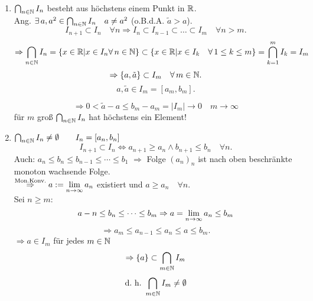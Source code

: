 \documentclass[../ana1.tex]{subfiles}
\begin{document}
\begin{bew}\leavevmode
	\begin{enumerate}
		\item \( \bigcap_{n\in\mathbb{N}} I_n \) besteht aus höchstens einem Punkt in \(\mathbb{R} \).\\
		Ang. \( \exists a, a^2 \in \bigcap_{n\in\N} I_n \quad a\neq a^2 \) (o.B.d.A. \(\tilde{a}>a\)).\\
		\[I_{n+1} \subset I_n \quad\forall n \Rightarrow I_n \subset I_{n-1} \subset \ldots\subset I_m \quad \forall n>m.\]
		\[ \Rightarrow \bigcap_{n\in\N} I_n = \{ x\in\R| x\in I_n \forall n\in\N \} \subset \{ x\in\R|x\in I_k \quad \forall 1\leq k \leq m \} = \bigcap_{k=1}^m I_k = I_m \]
		\[ \Rightarrow \{ a,\tilde{a} \} \subset I_m \quad\forall m\in\N. \]
		\[a,\tilde{a} \in I_m = [a_m,b_m]. \]
		\begin{center}
		\end{center}
		\[\Rightarrow 0<\tilde{a}-a \leq b_m - a_m = |I_m| \rightarrow 0 \quad m\rightarrow\infty \]
		\Lightning{} für \(m\) groß \(\bigcap_{n\in\mathbb{N}} I_n\) hat höchstens ein Element!
		\item \( \bigcap_{n\in\mathbb{N}} I_n \neq \emptyset \qquad I_n = [a_n,b_n] \) \\
		\[I_{n+1} \subset I_n \Leftrightarrow a_{n+1} \geq a_n \wedge b_{n+1} \leq b_n \quad \forall n. \]
		Auch: \( a_n \leq b_n \leq b_{n-1} \leq \cdots\leq b_1 \)
		\( \Rightarrow \) Folge \({(a_n)}_n\) ist nach oben beschränkte monoton wachsende Folge.\\
		\( \overset{\text{Mon.Konv.}}{\Rightarrow} a:= \lim\limits_{n\rightarrow\infty} a_n \) existiert und \(a\geq a_n \quad \forall n \).\\
		Sei \(n\geq m\):
		\[a-n\leq b_n\leq\cdots\leq b_m \Rightarrow a = \lim\limits_{n\rightarrow\infty} a_n \leq b_m \]
		\[\Rightarrow a_m\leq a_{n-1}\leq a_n\leq a\leq b_m. \]
		\( \Rightarrow a\in I_m\) für jedes \(m\in\mathbb{N} \) \\
		\[  \Rightarrow \{a\}\subset \bigcap_{m\in\mathbb{N}} I_m \]
		\[ \text{d.\ h.\ } \bigcap_{m\in\mathbb{N}} I_m \neq \emptyset \]
	\end{enumerate}
\end{bew}
\end{document}
